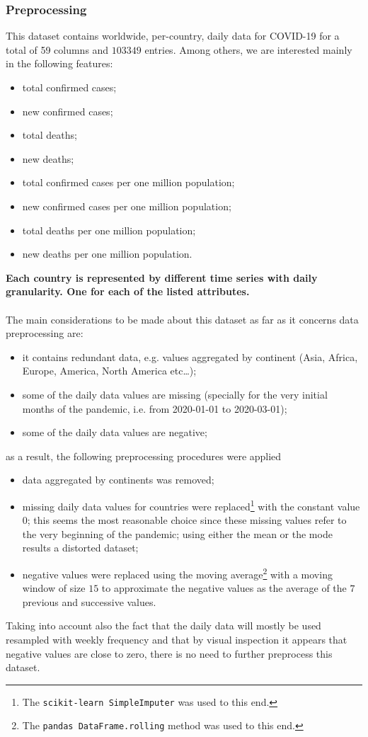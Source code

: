 \documentclass[11pt,a4paper]{article}
\begin{document}
\subsubsection{Preprocessing}
This dataset contains worldwide, per-country, daily data for COVID-19 for a
total of 59 columns and $103349$ entries. Among others, we are interested mainly
in the following features:
\begin{itemize}
    \item total confirmed cases;
    \item new confirmed cases;
    \item total deaths;
    \item new deaths;
    \item total confirmed cases per one million population;
    \item new confirmed cases per one million population;
    \item total deaths per one million population;
    \item new deaths per one million population.
\end{itemize}
\textbf{Each country is represented by different time series with daily
granularity. One for each of the listed attributes.}\\
\\
The main considerations to be made about this dataset as far as it concerns data
preprocessing are:
\begin{itemize}
    \item it contains redundant data, e.g. values aggregated by continent (Asia,
    Africa, Europe, America, North America etc\dots);
    \item some of the daily data values are missing (specially for the very
    initial months of the pandemic, i.e. from 2020-01-01 to 2020-03-01);
    \item some of the daily data values are negative;
\end{itemize}
as a result, the following preprocessing procedures were applied
\begin{itemize}
    \item data aggregated by continents was removed;
    \item missing daily data values for countries were replaced\footnote{The
    \texttt{scikit-learn SimpleImputer} was used to this end.} with the constant
    value $0$; this seems the most reasonable choice since these missing values
    refer to the very beginning of the pandemic; using either the mean or the
    mode results a distorted dataset;
    \item negative values were replaced using the moving average\footnote{The
    \texttt{pandas DataFrame.rolling} method was used to this end.} with a
    moving window of size $15$ to approximate the negative values as the average
    of the $7$ previous and successive values.
\end{itemize}
Taking into account also the fact that the daily data will mostly be used
resampled with weekly frequency and that by visual inspection it appears that
negative values are close to zero, there is no need to further preprocess this
dataset.
\end{document}
